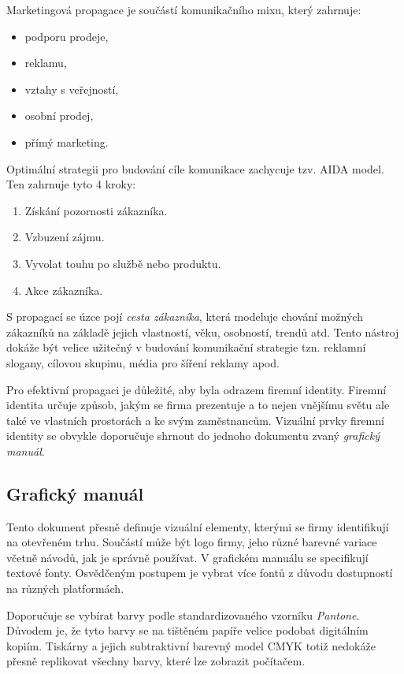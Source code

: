     Marketingová propagace je součástí komunikačního mixu, který zahrnuje:
        \begin{itemize}
            \item podporu prodeje,
            \item reklamu,
            \item vztahy s veřejností,
            \item osobní prodej,
            \item přímý marketing.
        \end{itemize}
    Optimální strategii pro budování cíle komunikace zachycuje tzv. AIDA model. Ten zahrnuje tyto 4 kroky:
        \begin{enumerate}
            \item Získání pozornosti zákazníka.
            \item Vzbuzení zájmu.
            \item Vyvolat touhu po službě nebo produktu.
            \item Akce zákazníka.
        \end{enumerate}
    S propagací se úzce pojí \emph{cesta zákazníka}, která modeluje chování možných zákazníků na základě jejich vlastností,
    věku, osobností, trendů atd. Tento nástroj dokáže být velice užitečný v budování komunikační strategie tzn. reklamní slogany,
    cílovou skupinu, média pro šíření reklamy apod. 

    Pro efektivní propagaci je důležité, aby byla odrazem firemní identity. Firemní identita určuje způsob, jakým se firma prezentuje
    a to nejen vnějšímu světu ale také ve vlastních prostorách a ke svým zaměstnancům. Vizuální prvky firemní identity se obvykle doporučuje shrnout do
    jednoho dokumentu zvaný \emph{grafický manuál}.

    \subsection{Grafický manuál}\label{ssec:marketing-graphic-manual}
    Tento dokument přesně definuje vizuální elementy, kterými se firmy identifikují na otevřeném trhu.
    Součástí může být logo firmy, jeho různé barevné variace včetně návodů, jak je správně používat. V grafickém manuálu se specifikují textové fonty.
    Osvědčeným postupem je vybrat více fontů z důvodu dostupností na různých platformách. 

    Doporučuje se vybírat barvy podle standardizovaného vzorníku \emph{Pantone}. Důvodem je,
    že tyto barvy se na tištěném papíře velice podobat digitálním kopiím. Tiskárny a jejich subtraktivní barevný model CMYK totiž nedokáže přesně replikovat
    všechny barvy, které lze zobrazit počítačem. 

